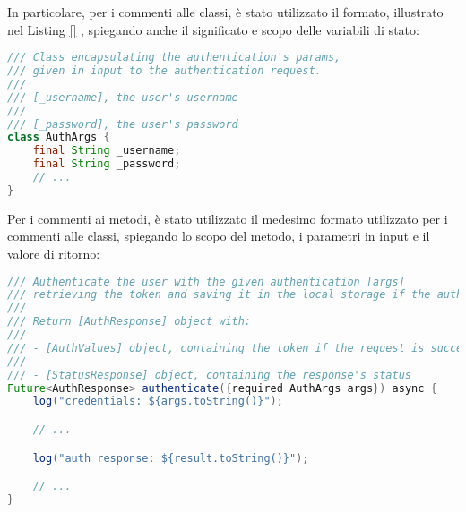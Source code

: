\noindent In particolare, per i commenti alle classi, è stato utilizzato il formato, illustrato nel Listing \ref{} , spiegando anche il significato e scopo delle variabili di stato:
\begin{lstlisting}[language=Java, caption={Commento classe}, captionpos=b]
/// Class encapsulating the authentication's params,
/// given in input to the authentication request.
///
/// [_username], the user's username
///
/// [_password], the user's password
class AuthArgs {
    final String _username;
    final String _password;
    // ...
}
\end{lstlisting}

\noindent Per i commenti ai metodi, è stato utilizzato il medesimo formato utilizzato per i commenti alle classi, spiegando lo scopo del metodo, i parametri in input e il valore di ritorno:
\begin{lstlisting}[language=Java, caption={Commento metodo}, captionpos=b]
/// Authenticate the user with the given authentication [args]
/// retrieving the token and saving it in the local storage if the authentication request is successful.
///
/// Return [AuthResponse] object with:
///
/// - [AuthValues] object, containing the token if the request is successful
///
/// - [StatusResponse] object, containing the response's status
Future<AuthResponse> authenticate({required AuthArgs args}) async {
    log("credentials: ${args.toString()}");

    // ...

    log("auth response: ${result.toString()}");

    // ...
}
\end{lstlisting}
